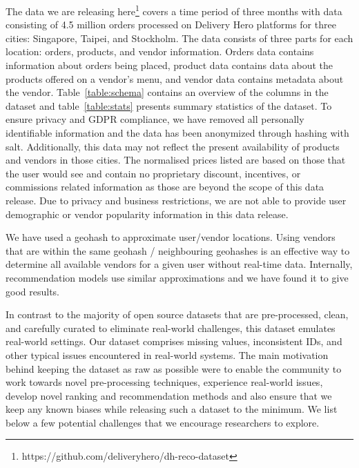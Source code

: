 \documentclass[manuscript]{acmart}
\newcommand{\datalink}{https://github.com/deliveryhero/dh-reco-dataset}
\begin{document}
The data we are releasing here\footnote{\datalink} covers a time period
of three months with data consisting of 4.5 million orders processed on
Delivery Hero platforms for three cities: Singapore, Taipei, and
Stockholm. The data consists of three parts for each location: orders,
products, and vendor information.  Orders data contains information about
orders being placed, product data contains data about the products
offered on a vendor's menu, and vendor data contains metadata about the
vendor. Table~\ref{table:schema} contains an overview of the columns in
the dataset and table~\ref{table:stats} presents summary statistics of
the dataset.  To ensure privacy and GDPR compliance, we have removed all
personally identifiable information and the data has been anonymized
through hashing with salt. Additionally, this data may not reflect the
present availability of products and vendors in those cities. The
normalised prices listed are based on those that the user would see and
contain no proprietary discount, incentives, or commissions related
information as those are beyond the scope of this data release.  Due to
privacy and business restrictions, we are not able to provide user
demographic or vendor popularity information in this data release. 

We have used a geohash \cite{geohash} to approximate user/vendor
locations. Using vendors that are within the same geohash / neighbouring
geohashes is an effective way to determine all available vendors for a
given user without real-time data.  Internally, recommendation models use
similar approximations and we have found it to give good results.

In contrast to the majority of open source datasets that are
pre-processed, clean, and carefully curated to eliminate real-world
challenges, this dataset emulates real-world settings. Our dataset comprises
missing values, inconsistent IDs, and other typical issues encountered in
real-world systems. The main motivation behind keeping the dataset as raw
as possible were to enable the community to work towards novel
pre-processing techniques, experience real-world issues, develop novel
ranking and recommendation methods and also ensure that we keep any known
biases while releasing such a dataset to the minimum. We list below a few
potential challenges that we encourage researchers to explore. 
\end{document}
